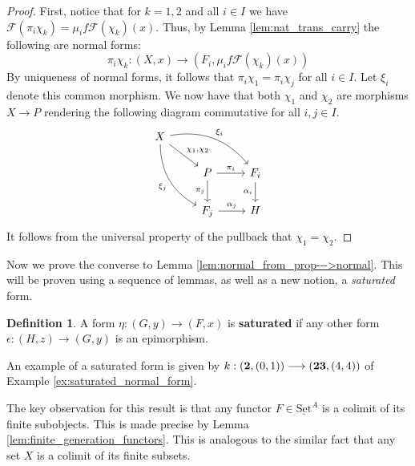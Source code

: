 \documentclass[12pt]{article}
\theoremstyle{plain}
\theoremstyle{definition}
\newtheorem{defn}[thm]{Definition} %
\newcommand{\scr}[1]{\mathscr{#1}}
\newcommand{\lto}{\longrightarrow}
\newcommand{\set}{\operatorname{\underline{Set}}}
\begin{document}
\begin{proof}
		First, notice that for $k = 1,2$ and all $i \in I$ we have $\scr{F}(\pi_i \chi_k) = \mu_i f \scr{F}(\chi_k)(x)$. Thus, by Lemma \ref{lem:nat_trans_carry} the following are normal forms:
		\begin{equation}
			\pi_i \chi_k: (X,x) \lto (F_i, \mu_i f \scr{F}(\chi_k)(x))
			\end{equation}
		By uniqueness of normal forms, it follows that $\pi_i \chi_1 = \pi_i \chi_j$ for all $i \in I$. Let $\xi_i$ denote this common morphism. We now have that both $\chi_1$ and $\chi_2$ are morphisms $X \lto P$ rendering the following diagram commutative for all $i, j \in I$.
		\begin{equation}
			\begin{tikzcd}
				X\arrow[rrd, bend left,"{\xi_i}"]\arrow[ddr,swap,bend right,"{\xi_j}"]\arrow[dr,"{\chi_1,\chi_2}"]\\
				& P\arrow[r,"{\pi_i}"]\arrow[d,swap,"{\pi_j}"] & F_i\arrow[d,swap,"{\alpha_i}"]\\
				& F_j\arrow[r,"{\alpha_j}"] & H
				\end{tikzcd}
			\end{equation}
		It follows from the universal property of the pullback that $\chi_1 = \chi_2$.
		\end{proof}
	
	Now we prove the converse to Lemma \ref{lem:normal_from_prop--->normal}. This will be proven using a sequence of lemmas, as well as a new notion, a \emph{saturated} form.
	
	\begin{defn}\label{def:saturated}
		A form $\eta: (G, y) \lto (F,x)$ is \textbf{saturated} if any other form $\epsilon: (H, z) \lto (G,y)$ is an epimorphism.
		\end{defn}
	
	An example of a saturated form is given by	$k: (\bold{2}, (0,1)) \lto (\bold{23}, (4,4))$ of Example \ref{ex:saturated_normal_form}.
	
	The key observation for this result is that any functor $F \in \set^A$ is a colimit of its finite subobjects. This is made precise by Lemma \ref{lem:finite_generation_functors}. This is analogous to the similar fact that any set $X$ is a colimit of its finite subsets.
	
\end{document}
